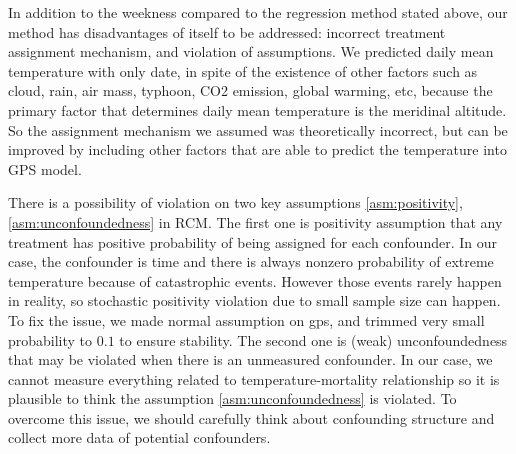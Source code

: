 \documentclass[12pt]{article}
\begin{document}
In addition to the weekness compared to the regression method stated above,
our method has disadvantages of itself to be addressed:
incorrect treatment assignment mechanism, and violation of assumptions.
We predicted daily mean temperature with only date,
in spite of the existence of other factors such as 
cloud, rain, air mass, typhoon, CO2 emission, global warming, etc,
because the primary factor that determines daily mean temperature is the meridinal altitude.
So the assignment mechanism we assumed was theoretically incorrect,
but can be improved by including other factors that are able to predict the temperature into GPS model.

There is a possibility of violation on 
two key assumptions \ref{asm:positivity},\ref{asm:unconfoundedness} in RCM.
The first one is positivity assumption
that any treatment has positive probability of being assigned for each confounder.
In our case, the confounder is time and 
there is always nonzero probability of extreme temperature because of catastrophic events.
However those events rarely happen in reality, 
so stochastic positivity violation\cite{zivich2022} due to small sample size can happen.
To fix the issue, we made normal assumption on gps,
and trimmed very small probability to $0.1$ to ensure stability.
The second one is (weak) unconfoundedness
that may be violated when there is an unmeasured confounder.
In our case, we cannot measure everything related to temperature-mortality relationship
so it is plausible to think the assumption \ref{asm:unconfoundedness} is violated.
To overcome this issue, we should carefully think about confounding structure
and collect more data of potential confounders.


{}

\end{document}
